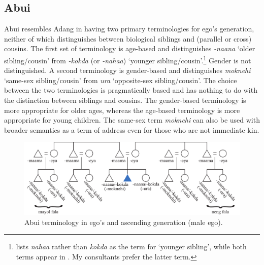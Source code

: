 \subsection{Abui}\label{sect_abui}
Abui resembles Adang in having two primary terminologies for ego's generation, neither of which distinguishes between biological siblings and (parallel or cross) cousins. The first set of terminology is age-based and distinguishes \textit{-naana} `older sibling/cousin' from \textit{-kokda} (or \textit{-nahaa}) `younger sibling/cousin'.\footnote{{ }  \citet[56]{Nicolspeyer1940} lists \textit{nahaa} rather than \textit{kokda} as the term for `younger sibling', while both terms appear in \citet{KratochvilEtAl2008}. My consultants prefer the latter term.}  Gender is not distinguished. A second terminology is gender-based and distinguishes \textit{moknehi} `same-sex sibling/cousin' from \textit{ura} `opposite-sex sibling/cousin'. The choice between the two terminologies is pragmatically based and has nothing to do with the distinction between siblings and cousins. The gender-based terminology is more appropriate for older ages, whereas the age-based terminology is more appropriate for young children. The same-sex term \textit{moknehi} can also be used with broader semantics as a term of address even for those who are not immediate kin.

\begin{figure}
\includegraphics[width=\textwidth]{figures/Holton_ch5_fig10.pdf}
\caption{Abui terminology in ego's and ascending generation (male ego). }
\end{figure}  

